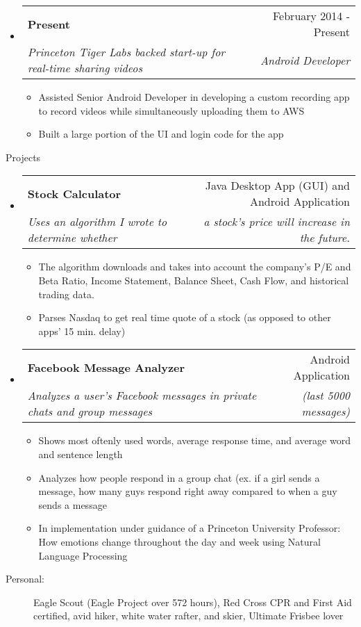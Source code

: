 \documentclass[letterpaper,11pt]{article}
\makeatletter
\newcommand{\resitem}[1]{\item #1 \vspace{-2pt}}
\newcommand{\resheading}[1]{{\large \parashade[.9]{sharpcorners}{\textbf{#1 \vphantom{p\^{E}}}}}}
\newcommand{\ressubheading}[4]{
\begin{tabular*}{6.5in}{l@{\extracolsep{\fill}}r}
		\textbf{#1} & #2 \\
		\textit{#3} & \textit{#4} \\
\end{tabular*}\vspace{-6pt}}
\makeatother
\begin{document}
\begin{itemize}
\item
	\ressubheading{Present}{February 2014 - Present}
		{Princeton Tiger Labs backed start-up for real-time 				sharing videos} {Android Developer}
		\begin {itemize}
		\resitem{Assisted Senior Android Developer in 						developing a custom recording app to record videos 				while simultaneously uploading them to AWS}
		\resitem{Built a large portion of the UI and login code 			for the app}
		\end{itemize}
\end{itemize}


\begin{description} 
	\item[Projects] 
\end{description}

\begin{itemize}

\item
	\ressubheading{Stock Calculator}{Java Desktop App (GUI) and 		Android Application}{Uses an algorithm I wrote to 				determine whether}{a stock's price will increase in the 		future.\space\space\space\space\space\space\space\space			\space}
	\begin{itemize}
		\resitem{The algorithm downloads and takes into account 			the company's P/E and Beta Ratio, Income Statement, 			Balance Sheet, Cash Flow, and historical trading 					data.}
		\resitem{Parses Nasdaq to get real time quote of a 					stock (as opposed to other apps' 15 min. delay)}
	\end{itemize}
	
\item
	\ressubheading{Facebook Message Analyzer}
		{Android Application}{Analyzes a user's Facebook 					messages in private chats and group messages}{(last 				5000 messages)\space\space\space\space\space\space}
	\begin{itemize}
		\resitem{Shows most oftenly used words, average 						response time, and average word and sentence 					length}
		\resitem{Analyzes how people respond in a group chat 					(ex. if a girl sends a message, how many guys 					respond right away compared to when a guy sends a 				message}
		\resitem{In implementation under guidance of a 						Princeton University Professor: How emotions change
			throughout the day and week using Natural Language 				Processing}
	\end{itemize}
\end{itemize}

\begin{description}
	\item[Personal:]Eagle Scout (Eagle Project over 572 hours), 		Red Cross CPR and First Aid certified, avid hiker, 				white water rafter, and skier, Ultimate Frisbee lover
\end{description}
\end{document}

